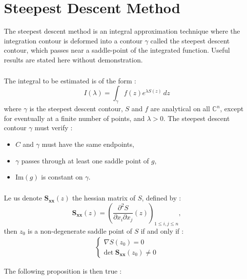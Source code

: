 \chapter{Steepest Descent Method}
\label{PhaseStationnaire}
The steepest descent method is an integral approximation technique where the integration contour is deformed into a contour $\gamma$ called the steepest descent contour, which passes near a saddle-point of the integrated function. Useful results are stated here without demonstration.

\paragraph{}
The integral to be estimated is of the form :
\begin{equation}
I(\lambda)=\int_{\gamma} f(z)e^{\lambda S(z)}\,dz
\end{equation}
where $\gamma$ is the steepest descent contour, $S$ and $f$ are analytical on all $\mathbb{C}^n$, except for eventually at a finite number of points, and $\lambda>0$. The steepest descent contour $\gamma$ must verify :
\begin{itemize}
\item $C$ and $\gamma$ must have the same endpoints,
\item $\gamma$ passes through at least one saddle point of $g$,
\item Im$(g)$ is constant on $\gamma$.
\end{itemize}

\paragraph{}
Le us denote $\mathbf{S_{xx}}(z)$ the hessian matrix of $S$, defined by :
\begin{equation}
\mathbf{S_{xx}}(z)=\left( \frac{\partial^2 S}{\partial x_i \partial x_j}(z) \right)_{1\leq i,j \leq n},
\end{equation}
then $z_ 0$ is a non-degenerate saddle point of $S$ if and only if :
\begin{eqnarray}
\left\{
\begin{array}{l}
\nabla S(z_0)=0 \\
\mbox{det} \; \mathbf{S_{xx}}(z_0) \neq 0
\end{array}
\right.
\end{eqnarray}

The following proposition is then true :


